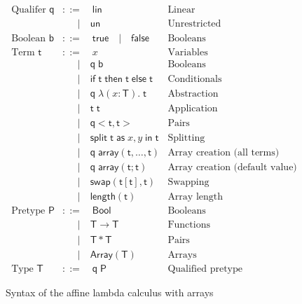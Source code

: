 \documentclass[10pt, english, a4paper]{article}
\begin{document}
\begin{figure}
\begin{align*}
\text{Qualifer }\mathsf{q} &::=\quad\mathsf{lin}&\text{Linear}\\
                           &\quad\;\;|\quad\mathsf{un}&\text{Unrestricted}\\
\text{Boolean }\mathsf{b}  &::=\quad \mathsf{true}\quad|\quad\mathsf{false}&\text{Booleans}\\
\text{Term }\mathsf{t}     &::=\quad x &\text{Variables}\\
                           &\quad\;\;|\quad\mathsf{q}\;\mathsf{b}&\text{Booleans}\\
                           &\quad\;\;|\quad \mathsf{if}\;\mathsf{t}\;\mathsf{then}\;\mathsf{t}\;\mathsf{else}\;\mathsf{t}&\text{Conditionals}\\
                           &\quad\;\;|\quad \mathsf{q}\;\lambda(x:\mathsf{T}).\;\mathsf{t}&\text{Abstraction}\\
                           &\quad\;\;|\quad\mathsf{t}\;\mathsf{t}&\text{Application}\\
                           &\quad\;\;|\quad\mathsf{q}<\mathsf{t},\mathsf{t}>&\text{Pairs}\\
                           &\quad\;\;|\quad\mathsf{split}\;\mathsf{t}\;\mathsf{as}\;x,y\;\mathsf{in}\;\mathsf{t}&\text{Splitting}\\
                           &\quad\;\;|\quad\mathsf{q}\;\mathsf{array}(\mathsf{t},\ldots,\mathsf{t})&\text{Array creation (all terms)}\\
                           &\quad\;\;|\quad\mathsf{q}\;\mathsf{array}(\mathsf{t};\mathsf{t})&\text{Array creation (default value)}\\
                           &\quad\;\;|\quad \mathsf{swap}(\mathsf{t}[\mathsf{t}], \mathsf{t})&\text{Swapping}\\
                           &\quad\;\;|\quad \mathsf{length}(\mathsf{t})&\text{Array length}\\
\text{Pretype }\mathsf{P}  &::= \quad\mathsf{Bool}&\text{Booleans}\\
                           &\quad\;\;|\quad\mathsf{T}\rightarrow\mathsf{T}&\text{Functions}\\
                           &\quad\;\;|\quad\mathsf{T}*\mathsf{T}&\text{Pairs}\\
                           &\quad\;\;|\quad\mathsf{Array} (\mathsf{T})&\text{Arrays}\\
\text{Type }\mathsf{T}      &::=\quad\mathsf{q}\;\mathsf{P}&\text{Qualified pretype}
\end{align*}
\caption{Syntax of the affine lambda calculus with arrays}
\end{figure}
\end{document}
